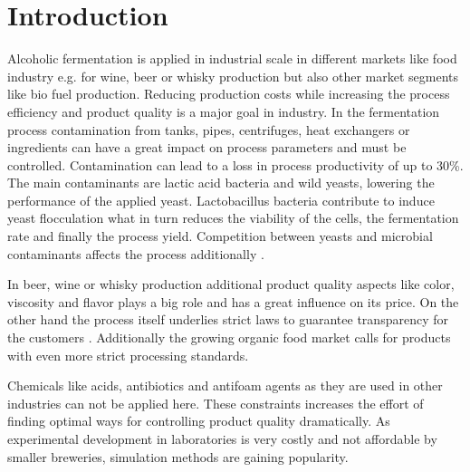 \section{Introduction}\label{sec:introduction}


Alcoholic fermentation is applied in industrial scale in different markets like food industry
e.g. for wine, beer or whisky production but also other market segments like bio fuel production.
Reducing production costs while increasing the process efficiency and product quality
is a major goal in industry. In the fermentation process contamination from tanks, pipes,
centrifuges, heat exchangers or ingredients can have a great impact on process parameters
and must be controlled. Contamination can lead to a loss in process productivity of up to
30\%. The main contaminants are lactic acid bacteria and wild yeasts, lowering the performance
of the applied yeast. Lactobacillus bacteria contribute to induce yeast flocculation what in turn
reduces the viability of the cells, the fermentation rate and finally the process yield. Competition
between yeasts and microbial contaminants affects the process additionally
\cite{brexo_impact_2017}\cite{narendranath_effects_1997}.

In beer, wine or whisky production additional product quality aspects like color, viscosity
and flavor plays a big role and has a great influence on its price. On the other hand the process
itself underlies strict laws to guarantee transparency for the customers\cite{biergesetz_1993}
\cite{weingesetz_1994}. Additionally the growing organic food market calls for products
with even more strict processing standards\cite{demeter_processing_standards_2017}.

Chemicals like acids, antibiotics and antifoam agents as they are used in other industries
can not be applied here. These constraints increases the effort of finding optimal ways for
controlling product quality dramatically. As experimental development in laboratories is very
costly and not affordable by smaller breweries, simulation methods are gaining popularity.


